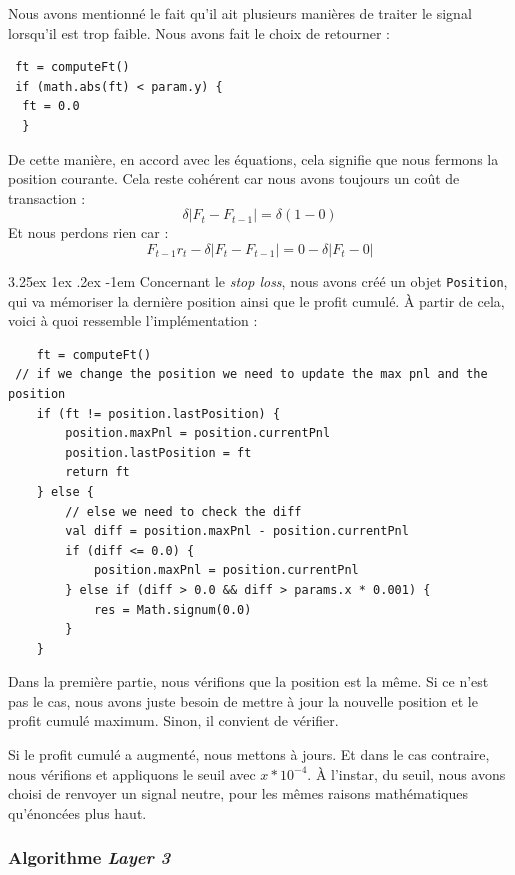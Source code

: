 \documentclass[a4paper, 11pt]{article}
\makeatletter
\renewcommand\paragraph{\@startsection{paragraph}{5}{\z@}%
  {3.25ex \@plus1ex \@minus.2ex}%
  {-1em}%
  {\normalfont\normalsize\bfseries}}
\makeatother
\begin{document}
Nous avons mentionné le fait qu'il ait plusieurs manières de traiter le signal lorsqu'il est trop faible. Nous avons fait le choix de
retourner :
\begin{lstlisting}
 ft = computeFt()
 if (math.abs(ft) < param.y) {
  ft = 0.0
  }
\end{lstlisting}
De cette manière, en accord avec les équations, cela signifie que nous fermons la position courante. Cela reste cohérent car nous avons
toujours un coût de transaction :
$$ \delta |F_t - F_{t-1}| = \delta (1 - 0)$$
Et nous perdons rien car :
$$ F_{t-1} r_t - \delta | F_t - F_{t-1}| = 0 - \delta | F_t - 0 |$$

\paragraph{}
Concernant le \textit{stop loss}, nous avons créé un objet \texttt{Position}, qui va mémoriser la dernière position ainsi que le profit
cumulé. À partir de cela, voici à quoi ressemble l'implémentation :
\begin{lstlisting}
    ft = computeFt()
 // if we change the position we need to update the max pnl and the position
    if (ft != position.lastPosition) {
        position.maxPnl = position.currentPnl
        position.lastPosition = ft
        return ft
    } else {
        // else we need to check the diff
        val diff = position.maxPnl - position.currentPnl
        if (diff <= 0.0) {
            position.maxPnl = position.currentPnl
        } else if (diff > 0.0 && diff > params.x * 0.001) {
            res = Math.signum(0.0)
        }
    }
\end{lstlisting}

Dans la première partie, nous vérifions que la position est la même. Si ce n'est pas le cas, nous avons juste besoin de mettre à jour la nouvelle
position et le profit cumulé maximum. Sinon, il convient de vérifier.

Si le profit cumulé a augmenté, nous mettons à jours. Et dans le cas contraire, nous vérifions et appliquons le seuil avec $x * 10^{-4}$.
À l'instar, du seuil, nous avons choisi de renvoyer un signal neutre, pour les mêmes raisons mathématiques qu'énoncées plus haut.

\subsubsection{Algorithme \textit{Layer 3}}
\end{document}
